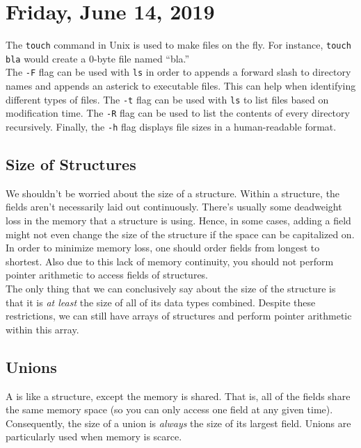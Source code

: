 \section{Friday, June 14, 2019}

The \verb!touch! command in Unix is used to make files on the fly. For instance, \texttt{touch bla} would create a $0$-byte file named ``bla.'' \\

The \verb!-F! flag can be used with \verb!ls! in order to appends a forward slash to directory names and appends an asterick to executable files. This can help when identifying different types of files. The \verb!-t! flag can be used with \verb!ls! to list files based on modification time. The \verb!-R! flag can be used to list the contents of every directory recursively. Finally, the \verb!-h! flag displays file sizes in a human-readable format. \\

\subsection{Size of Structures}

We shouldn't be worried about the size of a structure. Within a structure, the fields aren't necessarily laid out continuously. There's usually some deadweight loss in the memory that a structure is using. Hence, in some cases, adding a field might not even change the size of the structure if the space can be capitalized on. In order to minimize memory loss, one should order fields from longest to shortest. Also due to this lack of memory continuity, you should not perform pointer arithmetic to access fields of structures. \\


The only thing that we can conclusively say about the size of the structure is that it is \textit{at least} the size of all of its data types combined. Despite these restrictions, we can still have arrays of structures and perform pointer arithmetic within this array.

\subsection{Unions}

A  is like a structure, except the memory is shared. That is, all of the fields share the same memory space (so you can only access one field at any given time). Consequently, the size of a union is \textit{always} the size of its largest field. Unions are particularly used when memory is scarce. 

